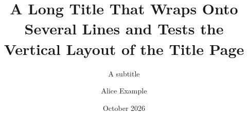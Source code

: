 \documentclass[11pt]{beamer}
\title{A Long Title That Wraps Onto Several Lines and Tests the Vertical Layout of the Title Page}
\subtitle{A subtitle}
\author{Alice Example}
\institute{Example University}
\date{October 2026}
\begin{document}
\begin{frame}\titlepage\end{frame}
\end{document}
